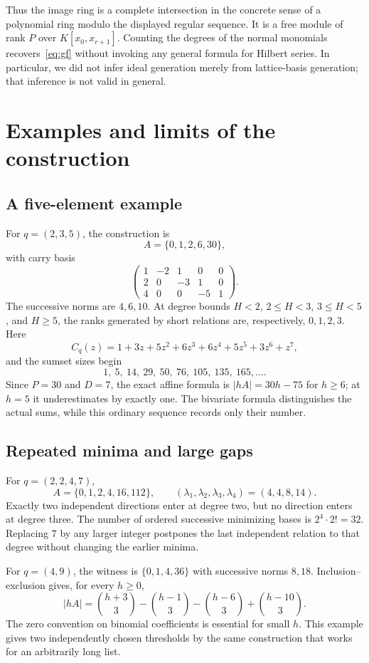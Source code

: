 \documentclass[11pt]{article}
\numberwithin{equation}{section}
\theoremstyle{definition}
\theoremstyle{remark}\newtheorem{remark}[theorem]{Remark}
\begin{document}
Thus the image ring is a complete intersection in the concrete sense of a
polynomial ring modulo the displayed regular sequence.  It is a free module
of rank $P$ over $K[x_0,x_{r+1}]$.  Counting the degrees of the normal
monomials recovers~\eqref{eq:gf} without invoking any general formula for
Hilbert series.  In particular, we did not infer ideal generation merely
from lattice-basis generation; that inference is not valid in general.

\section{Examples and limits of the construction}
\label{sec:limits}

\subsection{A five-element example}

For $q=(2,3,5)$, the construction is
\[
 A=\{0,1,2,6,30\},
\]
with carry basis
\[
 \begin{pmatrix}
 1&-2&1&0&0\\
 2&0&-3&1&0\\
 4&0&0&-5&1
 \end{pmatrix}.
\]
The successive norms are $4,6,10$.  At degree bounds $H<2$, $2\le H<3$,
$3\le H<5$, and $H\ge5$, the ranks generated by short relations are,
respectively, $0,1,2,3$.  Here
\[
 C_q(z)=1+3z+5z^2+6z^3+6z^4+5z^5+3z^6+z^7,
\]
and the sumset sizes begin
\[
 1,\ 5,\ 14,\ 29,\ 50,\ 76,\ 105,\ 135,\ 165,\ldots.
\]
Since $P=30$ and $D=7$, the exact affine formula is
$|hA|=30h-75$ for $h\ge6$; at $h=5$ it underestimates by exactly one.
The bivariate formula distinguishes the actual sums, while this ordinary
sequence records only their number.

\subsection{Repeated minima and large gaps}

For $q=(2,2,4,7)$,
\[
 A=\{0,1,2,4,16,112\},\qquad
 (\lambda_1,\lambda_2,\lambda_3,\lambda_4)=(4,4,8,14).
\]
Exactly two independent directions enter at degree two, but no direction
enters at degree three.  The number of ordered successive minimizing bases
is $2^4\cdot2!=32$.  Replacing $7$ by any larger integer postpones the
last independent relation to that degree without changing the earlier
minima.

For $q=(4,9)$, the witness is $\{0,1,4,36\}$ with successive norms $8,18$.
Inclusion--exclusion gives, for every $h\ge0$,
\[
 |hA|=\binom{h+3}{3}-\binom{h-1}{3}
      -\binom{h-6}{3}+\binom{h-10}{3}.
\]
The zero convention on binomial coefficients is essential for small $h$.
This example gives two independently chosen thresholds by the same
construction that works for an arbitrarily long list.
\end{document}
